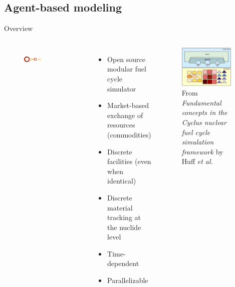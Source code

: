 \subsection{Agent-based modeling}
\begin{frame}{\Cyclus Overview\cite{huff_fundamental_2016}}

\begin{columns}
\begin{figure}
    \centering
    \includegraphics[width=0.4\textwidth]{images/logo2.png}
    \label{fig:my_label}
\end{figure}
\begin{itemize}
    \item Open source modular fuel cycle simulator
    \item Market-based exchange of resources (commodities)
    \item Discrete facilities (even when identical)
    \item Discrete material tracking at the nuclide level
    \item Time-dependent
    \item Parallelizable
\end{itemize}
\begin{figure}
    \centering
    \includegraphics[width=0.9\textwidth]{images/cyclus_region_inst_facility.jpg}
    \caption{From \textit{Fundamental concepts in the Cyclus nuclear fuel cycle simulation framework} by Huff \textit{et al.}\cite{huff_fundamental_2016}}
    \label{fig:Cyclus_setup}
\end{figure}
\end{columns}

\end{frame}



